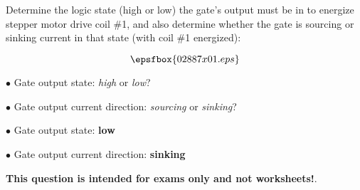 

Determine the logic state (high or low) the gate's output must be in to energize stepper motor drive coil \#1, and also determine whether the gate is sourcing or sinking current in that state (with coil \#1 energized):

$$\epsfbox{02887x01.eps}$$

\medskip
\item{$\bullet$} Gate output state: {\it high} or {\it low}?
\item{$\bullet$} Gate output current direction: {\it sourcing} or {\it sinking}?
\medskip







\medskip
\item{$\bullet$} Gate output state: {\bf low}
\item{$\bullet$} Gate output current direction: {\bf sinking}
\medskip







{\bf This question is intended for exams only and not worksheets!}.




